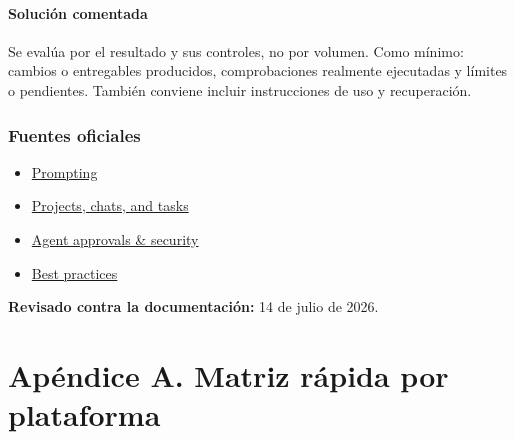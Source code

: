 \documentclass[10pt,a4paper,openany]{book}
\providecommand{\tightlist}{\setlength{\itemsep}{0.18em}\setlength{\parskip}{0pt}}
\begin{document}
\subsubsection{Solución comentada}\label{soluciuxf3n-comentada-21}

Se evalúa por el resultado y sus controles, no por volumen. Como mínimo:
cambios o entregables producidos, comprobaciones realmente ejecutadas y
límites o pendientes. También conviene incluir instrucciones de uso y
recuperación.

\subsection{Fuentes oficiales}\label{fuentes-oficiales-19}

\begin{itemize}
\tightlist
\item
  \href{https://learn.chatgpt.com/docs/prompting}{Prompting}
\item
  \href{https://learn.chatgpt.com/docs/projects}{Projects, chats, and
  tasks}
\item
  \href{https://learn.chatgpt.com/docs/agent-approvals-security}{Agent
  approvals \& security}
\item
  \href{https://learn.chatgpt.com/guides/best-practices}{Best practices}
\end{itemize}

\textbf{Revisado contra la documentación:} 14 de julio de 2026.

\chapter{Apéndice A. Matriz rápida por
plataforma}\label{apuxe9ndice-a.-matriz-ruxe1pida-por-plataforma}
\end{document}
